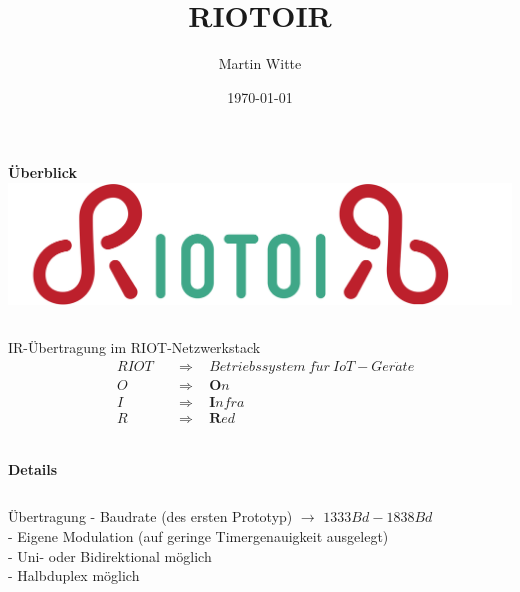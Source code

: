 \documentclass{beamer}
\title{RIOTOIR}
\author{Martin Witte}
\date{\today}
\begin{document}
\unitlength 5mm


\begin{frame} %
  \begin{block}{\textbf{Überblick}}
  	  \centering
	  \includegraphics[width=\linewidth]{riotoir-logo.png}
	  \begin{columns}[t]
	  	\begin{column}{.50\linewidth}
		  \begin{block}{IR-Übertragung im RIOT-Netzwerkstack}
		    \begin{align*}
		    &RIOT &&\Rightarrow~~~~Betriebssystem~f\ddot{u}r~IoT-Ger\ddot{a}te\\
		    &O &&\Rightarrow~~~~\textbf{O}n\\
		    &I &&\Rightarrow~~~~\textbf{I}nfra\\
		    &R &&\Rightarrow~~~~\textbf{R}ed\\
		    \end{align*}
		  \end{block}
	  \end{column}
  \end{columns}
	\end{block}
\vfill
  \begin{block}{\textbf{Details}}
    \begin{columns}[t]
      \begin{column}{.7\linewidth}
		\begin{block}{Übertragung}
			- Baudrate (des ersten Prototyp) $\rightarrow$ $1333 Bd - 1838 Bd$\\
			- Eigene Modulation (auf geringe Timergenauigkeit ausgelegt)\\
			- Uni- oder Bidirektional möglich\\
			- Halbduplex möglich\\
		\end{block}
	  \end{column}
    \end{columns}
\vspace{10pt}
	\begin{columns}[t]
	  \begin{column}{.45\linewidth}

\end{column}
\end{columns}
\end{block}
\end{frame}
\end{document}
